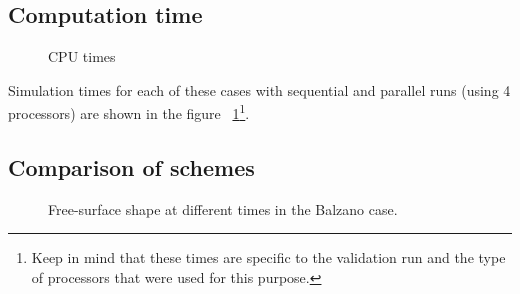 \subsection{Computation time}

\begin{figure}[H]
  \centering
  \caption{CPU times}\label{fig:balzano:cputime}
\end{figure}

Simulation times for each of these cases with sequential and parallel runs (using 4 processors) are shown in the figure ~\ref{fig:balzano:cputime}\footnote{Keep in mind that these times
are specific to the validation run and the type of processors that were used for this purpose.}.

\subsection{Comparison of schemes}

\begin{figure}[H]
\begin{minipage}[t]{0.5\textwidth}
 \centering
\end{minipage}%
\begin{minipage}[t]{0.5\textwidth}
 \centering
\end{minipage}
\begin{minipage}[t]{0.5\textwidth}
 \centering
\end{minipage}%
\begin{minipage}[t]{0.5\textwidth}
 \centering
\end{minipage}
\begin{minipage}[t]{0.5\textwidth}
 \centering
\end{minipage}%
\begin{minipage}[t]{0.5\textwidth}
 \centering
\end{minipage}
\caption{Free-surface shape at different times in the Balzano case.}
\label{fig:balzano:SL}
\end{figure}

